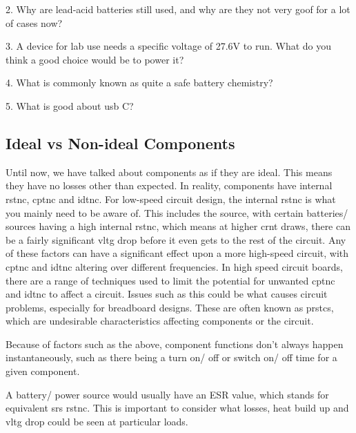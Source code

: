 \documentclass[a4paper,11pt]{report}
\begin{document}
2. Why are lead-acid batteries still used, and why are they not very goof for a lot of cases now?

3. A device for lab use needs a specific voltage of 27.6V to run. What do you think a good choice would be to power it?

4. What is commonly known as quite a safe battery chemistry?

5. What is good about \gls{usb} C?

\vspace*{1\baselineskip}

\subsection{Ideal vs Non-ideal Components}

Until now, we have talked about components as if they are ideal. This means they have no losses other than expected. In reality, components have internal \gls{rstnc}, \gls{cptnc} and \gls{idtnc}. For low-speed circuit design, the internal \gls{rstnc} is what you mainly need to be aware of. This includes the source, with certain batteries/ sources having a high internal \gls{rstnc}, which means at higher \gls{crnt} draws, there can be a fairly significant \gls{vltg} drop before it even gets to the rest of the circuit. Any of these factors can have a significant effect upon a more high-speed circuit, with \gls{cptnc} and \gls{idtnc} altering over different frequencies. In high speed circuit boards, there are a range of techniques used to limit the potential for unwanted \gls{cptnc} and \gls{idtnc} to affect a circuit. Issues such as this could be what causes circuit problems, especially for breadboard designs. These are often known as \gls{prstcs}, which are undesirable characteristics affecting components or the circuit.

Because of factors such as the above, component functions don't always happen instantaneously, such as there being a turn on/ off or switch on/ off time for a given component.

A battery/ power source would usually have an ESR value, which stands for equivalent \gls{srs} \gls{rstnc}. This is important to consider what losses, heat build up and \gls{vltg} drop could be seen at particular loads.
\end{document}
